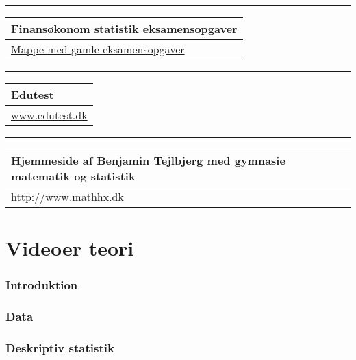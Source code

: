 \documentclass[]{book}
\begin{document}
\begin{center}\rule{0.5\linewidth}{\linethickness}\end{center}

\begin{longtable}[]{@{}l@{}}
\toprule
Finansøkonom statistik eksamensopgaver\tabularnewline
\midrule
\endhead
\href{https://drive.google.com/drive/folders/0B1E7VnhxsDMlUTJXLWowYjFNTzg?usp=sharing}{Mappe
med gamle eksamensopgaver}\tabularnewline
\bottomrule
\end{longtable}

\begin{center}\rule{0.5\linewidth}{\linethickness}\end{center}

\begin{longtable}[]{@{}l@{}}
\toprule
Edutest\tabularnewline
\midrule
\endhead
\href{http://www.edutest.dk}{www.edutest.dk}\tabularnewline
\bottomrule
\end{longtable}

\begin{center}\rule{0.5\linewidth}{\linethickness}\end{center}

\begin{longtable}[]{@{}l@{}}
\toprule
Hjemmeside af Benjamin Tejlbjerg med gymnasie matematik og
statistik\tabularnewline
\midrule
\endhead
\href{http://www.mathhx.dk/?q=node/117}{http://www.mathhx.dk}\tabularnewline
\bottomrule
\end{longtable}

\hypertarget{videoer-teori}{%
\section{Videoer teori}\label{videoer-teori}}

\hypertarget{introduktion}{%
\subsubsection{Introduktion}\label{introduktion}}

\hypertarget{data}{%
\subsubsection{Data}\label{data}}

\hypertarget{deskriptiv-statistik}{%
\subsubsection{Deskriptiv statistik}\label{deskriptiv-statistik}}
\end{document}
